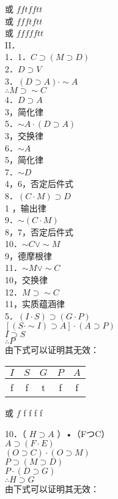 或 $f f t f f t t$\\
或 $f f f t f t t$\\
或 $f f f f f t t$\\
II．\\
1．1．$C \supset(M \supset D)$\\
2．$D \supset V$\\
3．$(D \supset A) \cdot \sim A$\\
$\therefore M \supset \sim C$\\
4．$D \supset A$\\
3，简化律\\
5．$\sim A \cdot(D \supset A)$\\
3，交换律\\
6．$\sim A$\\
5，简化律\\
7．$\sim D$\\
4，6，否定后件式\\
8．$(C \cdot M) \supset D$\\
1 ，输出律\\
9．$\sim(C \cdot M)$\\
8，7，否定后件式\\
10．$\sim C \vee \sim M$\\
9，德摩根律\\
11．$\sim M \vee \sim C$\\
10，交换律\\
12．$M \supset \sim C$\\
11，实质蕴涵律\\
5．$(I \cdot S) \supset(G \cdot P)$\\
$[(S \cdot \sim I) \supset A] \cdot(A \supset P)$\\
$I \supset S$\\
$\therefore P$\\
由下式可以证明其无效：

\begin{center}
\begin{tabular}{ccccc}
$I$ & $S$ & $G$ & $P$ & $A$ \\
\hline
f & f & t & f & f \\
\hline
\end{tabular}
\end{center}

或 $f$ f f f f

10．（ $H \supset A$ ）•（FつC）\\
$A \supset(F \cdot E)$\\
$(O \supset C) \cdot(O \supset M)$\\
$P \supset(M \supset D)$\\
$P \cdot(D \supset G)$\\
$\therefore H \supset G$\\
由下式可以证明其无效：

